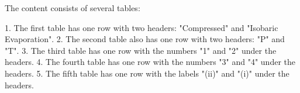The content consists of several tables:

1. The first table has one row with two headers: "Compressed" and "Isobaric Evaporation".
2. The second table also has one row with two headers: "P" and "T".
3. The third table has one row with the numbers "1" and "2" under the headers.
4. The fourth table has one row with the numbers "3" and "4" under the headers.
5. The fifth table has one row with the labels "(ii)" and "(i)" under the headers.